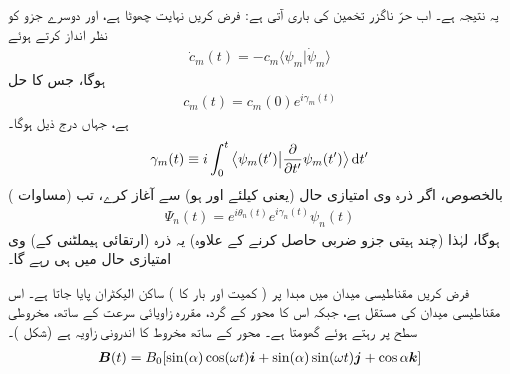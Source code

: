 یہ  نتیجہ ہے۔ اب حرّ ناگزر تخمین کی باری آتی ہے: فرض کریں  نہایت چھوٹا ہے، اور دوسرے جزو کو نظر انداز کرتے ہوئے 
\begin{align}
\dot{c}_m (t) = - c_m \langle \psi_m | \dot{\psi}_m \rangle
\end{align} 
ہوگا، جس کا حل 
\begin{align}\label{مساوات_حر_سی_ایم}
c_m (t) = c_m (0) e^{i \gamma_m (t)}
\end{align}
ہے، جہاں درج ذیل ہوگا۔
\begin{align}
\gamma_m (t) \equiv i \int_0^t \big\langle \psi_m (t') \big| \frac{\partial}{\partial t'} \psi_m (t') \big \rangle \dif t'
\end{align}
بالخصوص، اگر ذرہ  وی امتیازی حال (یعنی  کیلئے  اور  ہو) سے آغاز کرے، تب (مساوات ) 
\begin{align}\label{مساوات_حر_وہیں_رہتا_ہے}
\Psi_n (t) = e^{i \theta_n (t)} e^{i \gamma_n (t)} \psi_n (t)
\end{align}
ہوگا، لہٰذا (چند ہیتی جزو ضربی حاصل کرنے کے علاوہ) یہ ذرہ (ارتقائی ہیملٹنی کے)  وی امتیازی حال میں ہی رہے گا۔

فرض کریں مقناطیسی میدان میں مبدا پر ( کمیت  اور بار  کا ) ساکن الیکٹران پایا جاتا ہے۔ اس مقناطیسی میدان کی   مستقل ہے، جبکہ اس کا  محور  کے گرد، مقررہ زاویائی سرعت  کے ساتھ، مخروطی سطح پر رہتے ہوئے گھومتا ہے۔ محور  کے ساتھ مخروط کا اندرونی
 زاویہ  ہے (شکل )۔
\begin{align}\label{مساوات_حر_مخروط_مقناطیسی_میدان}
{\ensuremath{{\boldsymbol{B}}}} (t) = B_0 [\sin(\alpha) \cos(\omega t) {\boldsymbol{i}} + \sin(\alpha) \sin(\omega t) {\boldsymbol{j}} + \cos \alpha {\boldsymbol{k}}]
\end{align}

